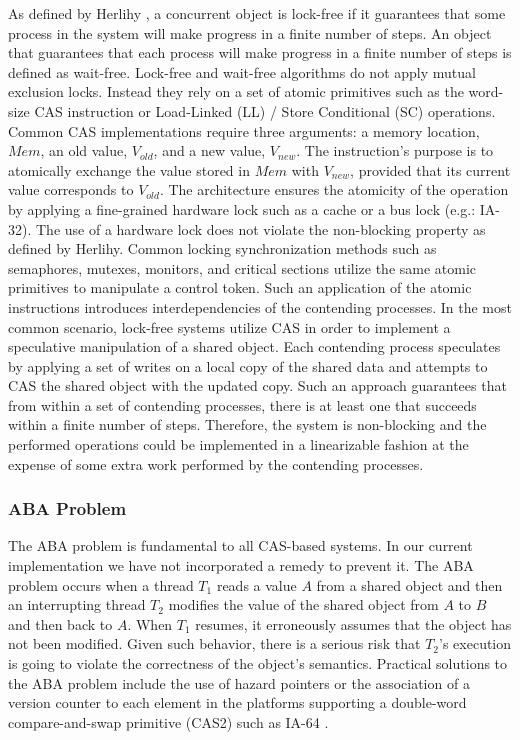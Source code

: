As defined by Herlihy \cite{Herlihy1993}, a concurrent object is
lock-free if it guarantees that some process in the system will make
progress in a finite number of steps. An object that guarantees that
each process will make progress in a finite number of steps is defined
as wait-free. Lock-free and wait-free algorithms do not apply mutual
exclusion locks. Instead they rely on a set of atomic primitives such
as the word-size CAS instruction or Load-Linked (LL) / Store
Conditional (SC) operations. Common CAS implementations require three
arguments: a memory location, $Mem$, an old value, $V_{old}$, and a
new value, $V_{new}$. The instruction's purpose is to atomically
exchange the value stored in $Mem$ with $V_{new}$, provided that its
current value corresponds to $V_{old}$. The architecture ensures the
atomicity of the operation by applying a fine-grained hardware lock
such as a cache or a bus lock (e.g.: IA-32). The use of a hardware
lock does not violate the non-blocking property as defined by
Herlihy. Common locking synchronization methods such as semaphores,
mutexes, monitors, and critical sections utilize the same atomic
primitives to manipulate a control token. Such an application of the
atomic instructions introduces interdependencies of the contending
processes. In the most common scenario, lock-free systems utilize CAS
in order to implement a speculative manipulation of a shared
object. Each contending process speculates by applying a set of writes
on a local copy of the shared data and attempts to CAS the shared
object with the updated copy. Such an approach guarantees that from
within a set of contending processes, there is at least one that
succeeds within a finite number of steps. Therefore, the system is
non-blocking and the performed operations could be implemented in a
linearizable fashion at the expense of some extra work performed by
the contending processes.

\subsubsection{ABA Problem}

The ABA problem is fundamental to all CAS-based systems. In our
current implementation we have not incorporated a remedy to prevent
it. The ABA problem occurs when a thread $T_1$ reads a value $A$ from
a shared object and then an interrupting thread $T_2$ modifies the
value of the shared object from $A$ to $B$ and then back to $A$. When
$T_1$ resumes, it erroneously assumes that the object has not been
modified. Given such behavior, there is a serious risk that $T_2$'s
execution is going to violate the correctness of the object's
semantics. Practical solutions to the ABA problem include the use of
hazard pointers \cite{Michael2004} or the association of a version
counter to each element in the platforms supporting a double-word
compare-and-swap primitive (CAS2) such as IA-64 \cite{Intel2010}.


